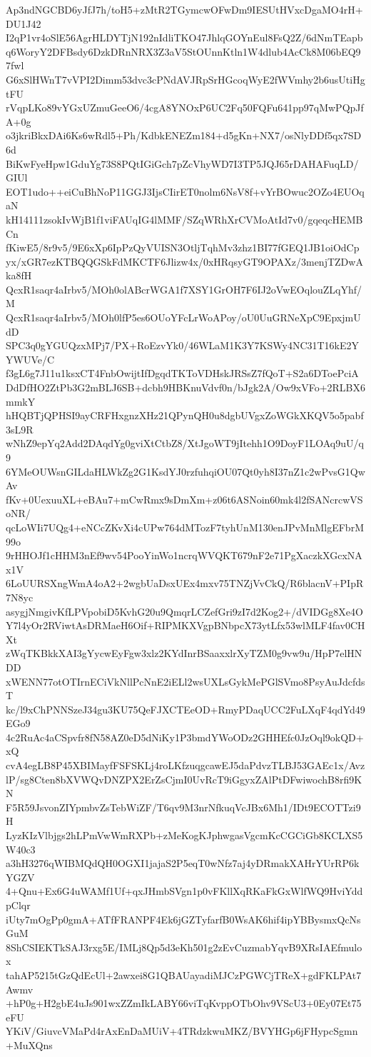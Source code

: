 Ap3ndNGCBD6yJfJ7h/toH5+zMtR2TGymcwOFwDm9IESUtHVxcDgaMO4rH+DU1J42
I2qP1vr4oSlE56AgrHLDYTjN192nIdliTKO47JhlqGOYnEul8FsQ2Z/6dNmTEapb
q6WoryY2DFBsdy6DzkDRnNRX3Z3aV5StOUnnKtln1W4dlub4AcCk8M06bEQ97fwl
G6xSlHWnT7vVPI2Dimm53dvc3cPNdAVJRpSrHGcoqWyE2fWVmhy2b6usUtiHgtFU
rVqpLKo89vYGxUZmuGeeO6/4cgA8YNOxP6UC2Fq50FQFu641pp97qMwPQpJfA+0g
o3jkriBkxDAi6Ks6wRdl5+Ph/KdbkENEZm184+d5gKn+NX7/osNlyDDf5qx7SD6d
BiKwFyeHpw1GduYg73S8PQtIGiGch7pZcVhyWD7I3TP5JQJ65rDAHAFuqLD/GIUl
EOT1udo++eiCuBhNoP11GGJ3IjsCIirET0nolm6NsV8f+vYrBOwuc2OZo4EUOqaN
kH14111zsokIvWjB1f1viFAUqIG4lMMF/SZqWRhXrCVMoAtId7v0/gqeqcHEMBCn
fKiwE5/8r9v5/9E6xXp6IpPzQyVUISN3OtljTqhMv3zhz1BI77fGEQ1JB1oiOdCp
yx/xGR7ezKTBQQGSkFdMKCTF6Jlizw4x/0xHRqsyGT9OPAXz/3menjTZDwAka8fH
QcxR1saqr4aIrbv5/MOh0olABcrWGA1f7XSY1GrOH7F6IJ2oVwEOqlouZLqYhf/M
QcxR1saqr4aIrbv5/MOh0lfP5es6OUoYFcLrWoAPoy/oU0UuGRNeXpC9EpxjmUdD
SPC3q0gYGUQzxMPj7/PX+RoEzvYk0/46WLaM1K3Y7KSWy4NC31T16kE2YYWUVe/C
f3gL6g7J11u1ksxCT4FnbOwijtIfDgqdTKToVDHskJRSsZ7fQoT+S2a6DToePciA
DdDfHO2ZtPb3G2mBLJ6SB+dcbh9HBKnuVdvf0n/bJgk2A/Ow9xVFo+2RLBX6mmkY
hHQBTjQPHSI9ayCRFHxgnzXHz21QPynQH0u8dgbUVgxZoWGkXKQV5o5pabf3sL9R
wNhZ9epYq2Add2DAqdYg0gviXtCtbZ8/XtJgoWT9jItehh1O9DoyF1LOAq9uU/q9
6YMeOUWsnGILdaHLWkZg2G1KsdYJ0rzfuhqiOU07Qt0yh8I37nZ1c2wPvsG1QwAv
fKv+0UexuuXL+eBAu7+mCwRmx9sDmXm+z06t6ASNoin60mk4l2fSANcrcwVSoNR/
qcLoWIi7UQg4+eNCcZKvXi4cUPw764dMTozF7tyhUnM130enJPvMnMlgEFbrM99o
9rHHOJf1cHHM3nEf9wv54PooYinWo1ncrqWVQKT679nF2e71PgXaczkXGcxNAx1V
6LoUURSXngWmA4oA2+2wgbUaDsxUEx4mxv75TNZjVvCkQ/R6blacnV+PIpR7N8yc
asygjNmgivKfLPVpobiD5KvhG20u9QmqrLCZefGri9zI7d2Kog2+/dVIDGg8Xe4O
Y7l4yOr2RViwtAsDRMaeH6Oif+RIPMKXVgpBNbpcX73ytLfx53wlMLF4fav0CHXt
zWqTKBkkXAI3gYycwEyFgw3xlz2KYdInrBSaaxxlrXyTZM0g9vw9u/HpP7elHNDD
xWENN77otOTIrnECiVkNllPcNnE2iELl2wsUXLsGykMePGlSVmo8PsyAuJdcfdsT
kc/l9xChPNNSzeJ34gu3KU75QeFJXCTEeOD+RmyPDaqUCC2FuLXqF4qdYd49EGo9
4c2RuAc4aCSpvfr8fN58AZ0eD5dNiKy1P3bmdYWoODz2GHHEfc0JzOql9okQD+xQ
cvA4egLB8P45XBIMayfFSFSKLj4roLKfzuqgcawEJ5daPdvzTLBJ53GAEc1x/Avz
lP/sg8Cten8bXVWQvDNZPX2ErZsCjmI0UvRcT9iGgyxZAlPtDFwiwochB8rfi9KN
F5R59JsvonZIYpmbvZsTebWiZF/T6qv9M3nrNfkuqVcJBx6Mh1/IDt9ECOTTzi9H
LyzKIzVlbjgs2hLPmVwWmRXPb+zMeKogKJphwgasVgcmKcCGCiGb8KCLXS5W40c3
a3hH3276qWIBMQdQH0OGXI1jajaS2P5eqT0wNfz7aj4yDRmakXAHrYUrRP6kYGZV
4+Qnu+Ex6G4uWAMf1Uf+qxJHmbSVgn1p0vFKllXqRKaFkGxWlfWQ9HviYddpClqr
iUty7mOgPp0gmA+ATfFRANPF4Ek6jGZTyfarfB0WsAK6hif4ipYBBysmxQcNsGuM
8ShCSIEKTkSAJ3rxg5E/IMLj8Qp5d3eKh501g2zEvCuzmabYqvB9XRsIAEfmulox
tahAP5215tGzQdEcUl+2awxei8G1QBAUayadiMJCzPGWCjTReX+gdFKLPAt7Awmv
+hP0g+H2gbE4uJs901wxZZmIkLABY66viTqKvppOTbOhv9VScU3+0Ey07Et75eFU
YKiV/GiuvcVMaPd4rAxEnDaMUiV+4TRdzkwuMKZ/BVYHGp6jFHypcSgmn+MuXQns
